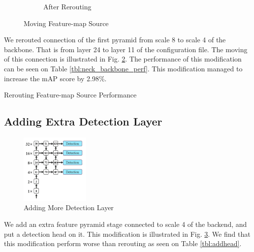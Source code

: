 \documentclass[conference]{IEEEtran}
\begin{document}
\begin{figure}[htbp]
\begin{subfigure}[][][t]{0.5\linewidth}
    \caption{After Rerouting}
    \label{fig:deeperconn-after}
  \end{subfigure}
\caption{Moving Feature-map Source}
\label{fig:deeperconn}
\end{figure}
We rerouted connection of the first pyramid from scale 8 to scale 4 of the backbone.
That is from layer 24 to layer 11 of the configuration file.
The moving of this connection is illustrated in Fig. \ref{fig:deeperconn}.
The performance of this modification can be seen on Table \ref{tbl:neck_backbone_perf}.
This modification managed to increase the mAP score by 2.98\%.

\begin{table}[htbp]
  \centering
  \caption{Rerouting Feature-map Source Performance}
  \label{tbl:neck_backbone_perf}
  \vspace{-1ex}
  
\end{table}


\subsection{Adding Extra Detection Layer}
\begin{figure}[htbp]
\centerline{\includegraphics[width=0.3\textwidth]{../book/figures/addheadn.png}}
\caption{Adding More Detection Layer}
\label{fig:add-head-2}
\end{figure}
We add an extra feature pyramid stage connected to scale 4 of the backend, and put a detection head on it.
This modification is illustrated in Fig. \ref{fig:add-head-2}. We find that this modification
perform worse than rerouting as seen on Table \ref{tbl:addhead}.
\begin{table}[htbp]
  \centering
  \label{tbl:addhead}
  \vspace{-1ex}
  
\end{table}
\end{document}
